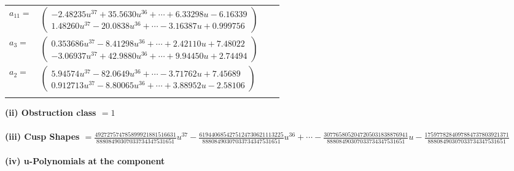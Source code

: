 \documentclass[1p]{elsarticle_modified}
\theoremstyle{definition}
\begin{document}
\begin{tabular}{m{7pt} m{180pt} m{7pt} m{180pt} }
\flushright $a_{11}=$&$\begin{pmatrix}-2.48235 u^{37}+35.5630 u^{36}+\cdots+6.33298 u-6.16339\\1.48260 u^{37}-20.0838 u^{36}+\cdots-3.16387 u+0.999756\end{pmatrix}$ \\
\flushright $a_{3}=$&$\begin{pmatrix}0.353686 u^{37}-8.41298 u^{36}+\cdots+2.42110 u+7.48022\\-3.06937 u^{37}+42.9880 u^{36}+\cdots+9.94450 u+2.74494\end{pmatrix}$ \\
\flushright $a_{2}=$&$\begin{pmatrix}5.94574 u^{37}-82.0649 u^{36}+\cdots-3.71762 u+7.45689\\0.912713 u^{37}-8.80065 u^{36}+\cdots+3.88952 u-2.58106\end{pmatrix}$\\&\end{tabular}
\flushleft \textbf{(ii) Obstruction class $= 1$}\\~\\
\flushleft \textbf{(iii) Cusp Shapes $= \frac{492727574785899921881516631}{88808490307033734347531651} u^{37}-\frac{6194406854275124730621113225}{88808490307033734347531651} u^{36}+\cdots-\frac{3077658052047205031838876941}{88808490307033734347531651} u-\frac{1759778284097884737803921371}{88808490307033734347531651}$}\\~\\
\newpage\renewcommand{\arraystretch}{1}
\flushleft \textbf{(iv) u-Polynomials at the component}\newline \\
\end{document}
